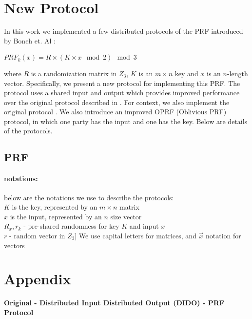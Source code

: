\section{New Protocol}


\iffalse

In this work we implemented a few distributed protocols of the PRF introduced by Boneh et. Al  \cite{darkmatter}:

$PRF_k(x) = R \times (K \times x \mod 2)  \mod 3 $

where $R$ is a randomization matrix in $Z_3$, $K$ is an $m \times n$ key and $x$ is an $n$-length vector. Specifically, we present a new protocol for implementing this PRF. The protocol uses a shared input and output which provides improved performance over the original protocol described in \cite{darkmatter}. For context, we also implement the original protocol \cite{darkmatter} . We also introduce an improved OPRF (Oblivious PRF) protocol, in which one party has the input and one has the key. Below are  details of the protocols.

\subsection{PRF}


\paragraph{notations:} below are the notations we use to describe the protocols: \\
$K$ is the key, represented by an $m \times n$ matrix \\
$x$ is the input, represented by an $n$ size vector \\
$R_x, r_k$ - pre-shared randomness for key $K$ and input $x$ \\
$r$ - random vector in $Z_3$]
We use capital letters for matrices, and $\vec{x}$ notation for vectors \\

\section{Appendix}

\paragraph{Original - Distributed Input Distributed Output (DIDO) - PRF Protocol}

